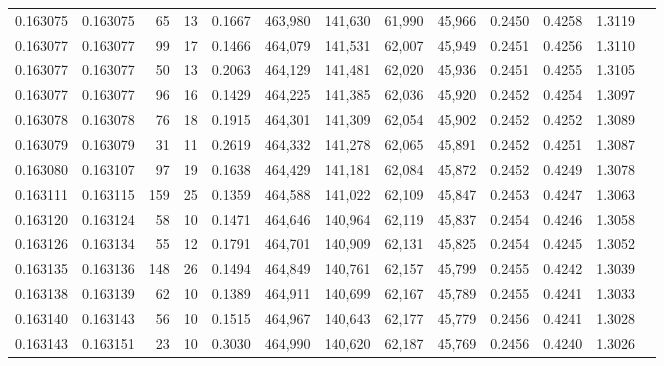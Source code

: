 \begin{tabular}{rrrrrrrrrrrrr}
0.163075 & 0.163075 &    65 &  13 &                                     0.1667 & 463,980 & 141,630 &  61,990 &  45,966 & 0.2450 & 0.4258 & 1.3119 \\
0.163077 & 0.163077 &    99 &  17 &                                     0.1466 & 464,079 & 141,531 &  62,007 &  45,949 & 0.2451 & 0.4256 & 1.3110 \\
0.163077 & 0.163077 &    50 &  13 &                                     0.2063 & 464,129 & 141,481 &  62,020 &  45,936 & 0.2451 & 0.4255 & 1.3105 \\
0.163077 & 0.163077 &    96 &  16 &                                     0.1429 & 464,225 & 141,385 &  62,036 &  45,920 & 0.2452 & 0.4254 & 1.3097 \\
0.163078 & 0.163078 &    76 &  18 &                                     0.1915 & 464,301 & 141,309 &  62,054 &  45,902 & 0.2452 & 0.4252 & 1.3089 \\
0.163079 & 0.163079 &    31 &  11 &                                     0.2619 & 464,332 & 141,278 &  62,065 &  45,891 & 0.2452 & 0.4251 & 1.3087 \\
0.163080 & 0.163107 &    97 &  19 &                                     0.1638 & 464,429 & 141,181 &  62,084 &  45,872 & 0.2452 & 0.4249 & 1.3078 \\
0.163111 & 0.163115 &   159 &  25 &                                     0.1359 & 464,588 & 141,022 &  62,109 &  45,847 & 0.2453 & 0.4247 & 1.3063 \\
0.163120 & 0.163124 &    58 &  10 &                                     0.1471 & 464,646 & 140,964 &  62,119 &  45,837 & 0.2454 & 0.4246 & 1.3058 \\
0.163126 & 0.163134 &    55 &  12 &                                     0.1791 & 464,701 & 140,909 &  62,131 &  45,825 & 0.2454 & 0.4245 & 1.3052 \\
0.163135 & 0.163136 &   148 &  26 &                                     0.1494 & 464,849 & 140,761 &  62,157 &  45,799 & 0.2455 & 0.4242 & 1.3039 \\
0.163138 & 0.163139 &    62 &  10 &                                     0.1389 & 464,911 & 140,699 &  62,167 &  45,789 & 0.2455 & 0.4241 & 1.3033 \\
0.163140 & 0.163143 &    56 &  10 &                                     0.1515 & 464,967 & 140,643 &  62,177 &  45,779 & 0.2456 & 0.4241 & 1.3028 \\
0.163143 & 0.163151 &    23 &  10 &                                     0.3030 & 464,990 & 140,620 &  62,187 &  45,769 & 0.2456 & 0.4240 & 1.3026 \\

\end{tabular}
